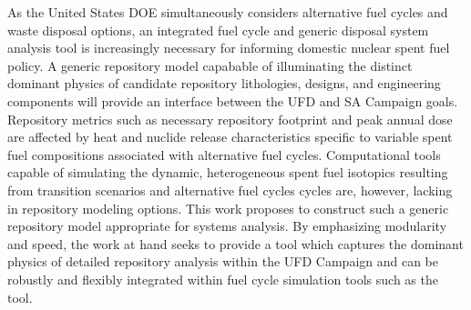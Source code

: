 As the United States \gls{DOE} simultaneously considers alternative fuel cycles 
and waste disposal options, an integrated fuel cycle and generic disposal system 
analysis tool is increasingly necessary for informing domestic nuclear spent 
fuel policy. A generic repository model capabable of illuminating the distinct 
dominant physics of candidate repository lithologies, designs, and engineering 
components will provide an interface between the \gls{UFD} and \gls{SA} Campaign 
goals. Repository metrics such as necessary repository footprint and peak annual 
dose are affected by heat and nuclide release characteristics specific to 
variable spent fuel compositions associated  with alternative fuel cycles. 
Computational tools capable of simulating the dynamic, heterogeneous spent fuel 
isotopics resulting from transition scenarios and alternative fuel cycles cycles 
are, however, lacking in repository modeling  options. This work proposes to 
construct such a generic repository model appropriate for systems analysis. By 
emphasizing modularity and speed, the work at hand seeks to  provide a tool 
which captures the dominant physics of detailed repository analysis within the 
\gls{UFD} Campaign and can be robustly and flexibly integrated within fuel cycle 
simulation tools such as the \Cyclus tool.


\glsresetall
